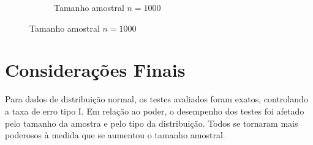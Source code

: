 \documentclass[a4paper,11pt]{article} %
\begin{document}
\begin{figure}[H]
\begin{subfigure}[b]{0.45\textwidth}
        \caption{Tamanho amostral \(n = 1000\)}
        \label{fig:cauchy_poder_1000}
    \end{subfigure}
\end{figure}





\section{Considerações Finais}

Para dados de distribuição normal, os testes avaliados foram exatos, controlando a taxa de erro tipo I. Em relação ao poder, o desempenho dos testes foi afetado pelo tamanho da amostra e pelo tipo da distribuição. Todos se tornaram mais poderosos à medida que se aumentou o tamanho amostral. 
\end{document}
